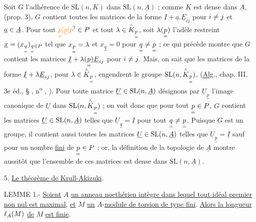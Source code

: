 Soit $G$ l'adhérence de $\mathrm{SL}(n,K)$ dans $\mathrm{SL}(n,\underline{A})$ ; comme $K$ est dense dans $\underline{A}$, (prop. 3), $G$ contient toutes les matrices de la forme $\underline{I}+\underline{a}.\underline{E}_{ij}$ pour $i\ne j$ et $\underline{a}\in\underline{A}$. Pour tout $\unsure{\underset{=}{p}|\underline{p}|p}\handwritten{\in}P$ et tout $\lambda\in\overset{\scriptscriptstyle\wedge}{K}_{\underset{=}{p}}$, soit $\lambda(\underset{=}{p})$ l'adèle restreint $\underline{x}=(x_{\underset{=}{q}})_{\underset{=}{q}\in P}$ tel que $x_{\underset{=}{p}}=\lambda$ et $x_{\underset{=}{q}}=0$ pour $\underset{=}{q}\ne\underset{=}{p}$ ; ce qui précède montre que $G$ contient les matrices $\underline{I}+\lambda(\underset{=}{p})\underline{E}_{ij}$ pour $i\ne j$. Mais, on sait que les matrices de la forme $\underline{I}+\lambda\underline{E}_{ij}$, pour $\lambda\in\overset{\scriptscriptstyle\wedge}{K}_{\underset{=}{p}}$, engendrent le groupe $\mathrm{SL}(n,\overset{\scriptscriptstyle\wedge}{K}_{\underset{=}{p}})$, (\uline{Alg}., chap. III, 3e éd., § \hspace{1em}, n\textsuperscript{o} \hspace{1em}, \hspace{1.7em}). Pour toute matrice $\underline{U}\in\mathrm{SL}(n,\underline{A})$ désignons par $\underline{U}_{\underset{=}{p}}$ l'image canonique de $\underline{U}$ dans $\mathrm{SL}(n,\overset{\scriptscriptstyle\wedge}{K}_{\underset{=}{p}})$ ; on voit donc que pour tout $\underset{=}{p}\in P$, $G$ contient les matrices $\underline{U}\in\mathrm{SL}(n,\underline{A})$ telles que $\underline{U}_{\underset{=}{q}}=\underline{I}$ pour tout $\underset{=}{q}\ne\underset{=}{p}$. Puisque $G$ est un groupe, il contient aussi toutes les matrices $\underline{U}\in\mathrm{SL}(n,\underline{A})$ telles que $\underline{U}_{\underset{=}{p}}=\underline{I}$ sauf pour un nombre \uline{fini} de $\underset{=}{p}\in P$ ; or, la définition de la topologie de $\underline{A}$ montre aussitôt que l'ensemble de ces matrices est dense dans $\mathrm{SL}(n,\underline{A})$.

5. \uline{Le théorème de Krull-Akizuki}.

LEMME 1.- \uline{Soient} $A$ \uline{un anneau noethérien intègre dans lequel tout idéal premier non nul est maximal}, \uline{et} $M$ \uline{un} $A$-\uline{module de torsion de type fini}. \uline{Alors la longueur} $\ell_A(M)$ \uline{de} $M$ \uline{est finie}.

